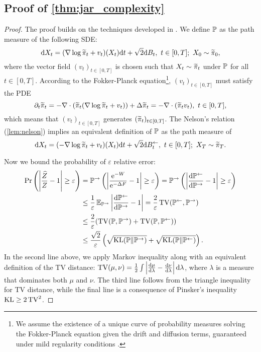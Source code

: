 \subsection{Proof of \cref{thm:jar_complexity}}
\begin{proof}
\label{prf:thm:jar_complexity}
The proof builds on the techniques developed in \citet[Thm. 1]{guo2025provable}. We define $\P$ as the path measure of the following SDE:
\begin{equation}
    \d X_t=(\nabla\log\pit_t+v_t)(X_t)\d t+\sqrt{2}\d B_t,~t\in[0,T];~X_0\sim\pit_0,
    \label{eq:jar_p}
\end{equation}
where the vector field $(v_t)_{t\in[0,T]}$ is chosen such that $X_t\sim\pit_t$ under $\P$ for all $t\in[0,T]$. According to the Fokker-Planck equation\footnote{We assume the existence of a unique curve of probability measures solving the Fokker-Planck equation given the drift and diffusion terms, guaranteed under mild regularity conditions \citep{lebris2008existence}.}, $(v_t)_{t\in[0,T]}$ must satisfy the PDE
$$\partial_t\pit_t=-\nabla\cdot(\pit_t(\nabla\log\pit_t+v_t))+\Delta\pit_t=-\nabla\cdot(\pit_tv_t),~t\in[0,T],$$
which means that $(v_t)_{t\in[0,T]}$ generates $(\pit_t)_{t\in[0,T]}$. The Nelson's relation (\cref{lem:nelson}) implies an equivalent definition of $\P$ as the path measure of
$$\d X_t=(-\nabla\log\pit_t+v_t)(X_t)\d t+\sqrt{2}\d\Bl_t,~t\in[0,T];~X_T\sim\pit_T.$$

Now we bound the probability of $\varepsilon$ relative error:
\begin{align}
    \prob\ro{\abs{\frac{\Zh}{Z}-1}\ge\varepsilon} & =\Pr\ro{\abs{\frac{\e^{-W}}{\e^{-\Delta F}}-1}\ge\varepsilon} =\Pr\ro{\abs{\de{\Pl}{\Pr}-1}\ge\varepsilon}      \nonumber\\
                                                &\le\frac{1}{\varepsilon}\E_{\Pr}{\abs{\de{\Pl}{\Pr}-1}}=\frac{2}{\varepsilon}\tv(\Pl,\Pr)\nonumber\\
                                                &\le\frac{2}{\varepsilon}(\tv(\P,\Pr)+\tv(\P,\Pl))\nonumber\\
                                                &\le\frac{\sqrt{2}}{\varepsilon}\ro{\sqrt{\kl(\P\|\Pr)}+\sqrt{\kl(\P\|\Pl)}}.\label{eq:jar_acc_bound}
\end{align}
In the second line above, we apply Markov inequality along with an equivalent definition of the TV distance: $\tv(\mu,\nu)=\frac{1}{2}\int\abs{\de{\mu}{\lambda}-\de{\nu}{\lambda}}\d\lambda$, where $\lambda$ is a measure that dominates both $\mu$ and $\nu$. The third line follows from the triangle inequality for TV distance, while the final line is a consequence of Pinsker's inequality $\kl\ge2\tv^2$.


\end{proof}
